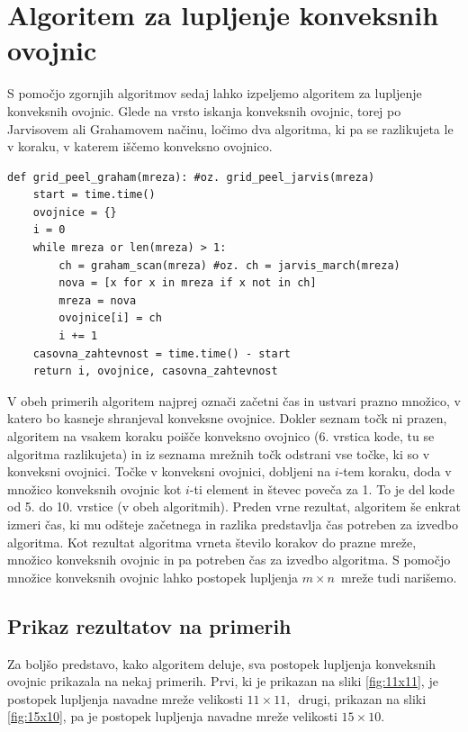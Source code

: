 \documentclass[a4paper]{article}
\begin{document}
\section{Algoritem za lupljenje konveksnih ovojnic}
S pomočjo zgornjih algoritmov sedaj lahko izpeljemo algoritem za lupljenje konveksnih ovojnic. Glede na vrsto iskanja konveksnih ovojnic, torej po Jarvisovem ali 
Grahamovem načinu, ločimo dva algoritma, ki pa se razlikujeta le v koraku, v katerem iščemo konveksno ovojnico.

\begin{lstlisting}
def grid_peel_graham(mreza): #oz. grid_peel_jarvis(mreza)
    start = time.time()
    ovojnice = {}
    i = 0
    while mreza or len(mreza) > 1:
        ch = graham_scan(mreza) #oz. ch = jarvis_march(mreza)
        nova = [x for x in mreza if x not in ch]
        mreza = nova
        ovojnice[i] = ch
        i += 1
    casovna_zahtevnost = time.time() - start 
    return i, ovojnice, casovna_zahtevnost
\end{lstlisting}

V obeh primerih algoritem najprej označi začetni čas in ustvari prazno množico, v katero bo kasneje shranjeval konveksne ovojnice. Dokler seznam točk ni prazen, algoritem na vsakem koraku 
poišče konveksno ovojnico (6. vrstica kode, tu se algoritma razlikujeta) in iz seznama mrežnih točk odstrani vse točke, ki so v konveksni ovojnici. Točke v konveksni ovojnici, dobljeni na 
$i$-tem koraku, doda v množico konveksnih ovojnic kot $i$-ti element in števec poveča za 1. To je del kode od 5. do 10. vrstice (v obeh algoritmih). Preden vrne rezultat, algoritem še enkrat 
izmeri čas, ki mu odšteje začetnega in razlika predstavlja čas potreben za izvedbo algoritma. Kot rezultat algoritma vrneta število korakov do prazne mreže, množico konveksnih ovojnic in pa 
potreben čas za izvedbo algoritma. S pomočjo množice konveksnih ovojnic lahko postopek lupljenja $m \times n$~mreže tudi narišemo.

\subsection{Prikaz rezultatov na primerih}
Za boljšo predstavo, kako algoritem deluje, sva postopek lupljenja konveksnih ovojnic prikazala na nekaj primerih. Prvi, ki je prikazan na sliki \ref{fig:11x11}, je postopek lupljenja 
navadne mreže velikosti $11 \times 11,$~drugi, prikazan na sliki \ref{fig:15x10}, pa je postopek lupljenja navadne mreže velikosti $15 \times 10$. 
\end{document}
